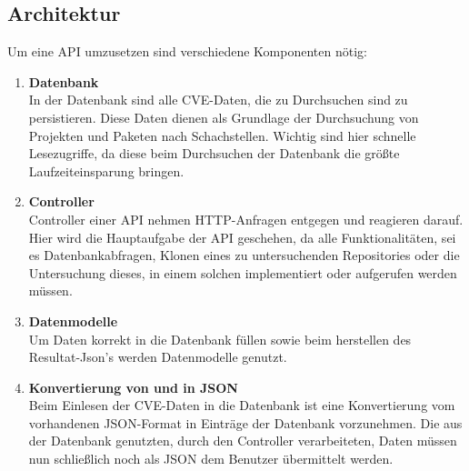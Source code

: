 \subsection{Architektur} \label{sec:Architektur}
Um eine API umzusetzen sind verschiedene Komponenten nötig:
\begin{enumerate}
    \item \textbf{Datenbank} \\
        In der Datenbank sind alle CVE-Daten, die zu Durchsuchen sind zu persistieren.
        Diese Daten dienen als Grundlage der Durchsuchung von Projekten und Paketen nach Schachstellen.
        Wichtig sind hier schnelle Lesezugriffe, da diese beim Durchsuchen der Datenbank die größte Laufzeiteinsparung bringen. 
    \item \textbf{Controller} \\
        Controller einer API nehmen HTTP-Anfragen entgegen und reagieren darauf.
        Hier wird die Hauptaufgabe der API geschehen, da alle Funktionalitäten, sei es Datenbankabfragen, Klonen eines zu untersuchenden Repositories oder die Untersuchung dieses, in einem solchen implementiert oder aufgerufen werden müssen.
    \item \textbf{Datenmodelle} \\
        Um Daten korrekt in die Datenbank füllen sowie beim herstellen des Resultat-Json's werden Datenmodelle genutzt.
    \item \textbf{Konvertierung von und in JSON} \\
        Beim Einlesen der CVE-Daten in die Datenbank ist eine Konvertierung vom vorhandenen JSON-Format in Einträge der Datenbank vorzunehmen.  
        Die aus der Datenbank genutzten, durch den Controller verarbeiteten, Daten müssen nun schließlich noch als JSON dem Benutzer übermittelt werden.
\end{enumerate}